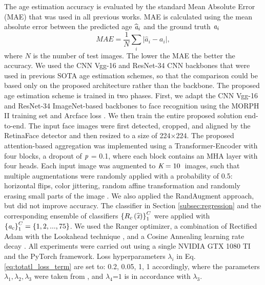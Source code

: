 \documentclass[10pt,journal]{IEEEtran}\usepackage{amsfonts}
\begin{document}
\label{subsec:Implementation Details}

The age estimation accuracy is evaluated by the standard Mean Absolute Error
(MAE) that was used in all previous works. MAE is calculated using the mean
absolute error between the predicted age $\widehat{{\emph{a}}}{_{i}}$ and the
ground truth ${\emph{a}_{i}}$
\begin{equation}
MAE\mathbf{=}{\frac{1}{N}\sum\limits_{i}|}\widehat{{a}}{_{i}-a_{i}|,}\label{equ:MAEeq}\end{equation}
where $N$ is the number of test images. The lower the MAE the better the
accuracy. We used the CNN Vgg-16 \cite{vgg} and ResNet-34 \cite{7780459} CNN
backbones that were used in previous SOTA age estimation schemes, so that the
comparison could be based only on the proposed architecture rather than the
backbone. The proposed age estimation scheme is trained in two phases. First,
we adapt the CNN Vgg-16 \cite{vgg} and ResNet-34 \cite{7780459} ImageNet-based
backbones to face recognition using the MORPH II \cite{1613043} training set
and Arcface loss \cite{8953658}. We then train the entire proposed solution
end-to-end. The input face images were first detected, cropped, and aligned by
the RetinaFace detector \cite{RetinaFace} and then resized to a size of
224$\times$224. The proposed attention-based aggregation was implemented using
a Transformer-Encoder with four blocks, a dropout of $\emph{p}$ = 0.1, where
each block contains an MHA layer with four heads. Each input image was
augmented to $\emph{K}=10$\thinspace$\ $ images, such that multiple
augmentations were randomly applied with a probability of 0.5: horizontal
flips, color jittering, random affine transformation and randomly erasing
small parts of the image \cite{8954382}. We also applied the RandAugment
\cite{Randaugment} approach, but did not improve accuracy. The classifier in
Section \ref{subsec:regression} and the corresponding ensemble of classifiers
$\left\{  R_{c}\left(  \widehat{\emph{x}}\right)  \right\}  _{1}^{C}$ were
applied with $\left\{  \emph{a}_{c}\right\}  _{1}^{C}=\left\{
1,2,...,75\right\}  $. We used the Ranger optimizer, a combination of
Rectified Adam \cite{Liu2020OnTV} with the Lookahead technique
\cite{Lookahead}, and a Cosine Annealing learning rate decay \cite{SGDR}. All
experiments were carried out using a single NVIDIA GTX 1080 TI and the PyTorch
framework. Loss hyperparameters $\lambda_{i}$ in Eq. \ref{eq:totatl_loss_term}
are set to: {0.2, 0.05, 1, 1} accordingly, where the parameters $\lambda
_{1},\lambda_{2},\lambda_{3}$ were taken from \cite{Mean-Variance}, and
$\lambda_{4}$=$1$ is in accordance with $\lambda_{3}$.
\end{document}
